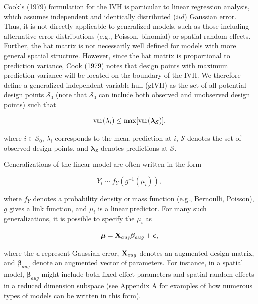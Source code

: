 \documentclass[12pt,english]{article}
\begin{document}
\begin{spacing}{1.9}
Cook's (1979) formulation for the IVH is particular to linear regression analysis, which assumes independent and identically distributed ($iid$) Gaussian error. Thus, it is not directly applicable to generalized models, such as those including alternative error distributions (e.g., Poisson, binomial) or spatial random effects.  Further, the hat matrix is not necessarily well defined for models with more general spatial structure. However, since the hat matrix is proportional to prediction variance, Cook (1979) notes that design points with maximum prediction variance will be located on the boundary of the IVH.  We therefore define a generalized independent variable hull (gIVH) as the set of all potential design points $\mathcal{S}_0$ (note that $\mathcal{S}_0$ can include both observed and unobserved design points) such that
\begin{linenomath*}
\begin{equation}
  \label{eq:gIVH}
  {\rm var}(\lambda_i) \le {\rm max} [{\rm var}(\boldsymbol{\lambda}_{\mathcal{S}})],
\end{equation}
\end{linenomath*}
where $i \in \mathcal{S}_0$, $\lambda_i$ corresponds to the mean prediction at $i$, $\mathcal{S}$ denotes the set of observed design points, and $\boldsymbol{\lambda}_\mathcal{S}$ denotes predictions at $\mathcal{S}$.

Generalizations of the linear model are often written in the form
\begin{linenomath*}
\begin{equation}
  Y_i \sim f_Y(g^{-1}(\mu_i)),
\end{equation}
\end{linenomath*}
where $f_Y$ denotes a probability density or mass function (e.g., Bernoulli, Poisson), $g$ gives a link function, and
$\mu_i$ is a linear predictor.  For many such generalizations, it is possible to specify the $\mu_i$ as
\begin{linenomath*}
\begin{equation}
  \boldsymbol{\mu} = {\bf X}_{aug}\boldsymbol{\beta}_{aug} + \boldsymbol{\epsilon},
  \label{eq:mu-aug}
\end{equation}
\end{linenomath*}
where the $\boldsymbol{\epsilon}$ represent Gaussian error, ${\bf X}_{aug}$ denotes an augmented design matrix, and $\boldsymbol{\beta}_{aug}$ denote an augmented vector of parameters.  For instance, in a spatial model, $\boldsymbol{\beta}_{aug}$ might include both fixed effect parameters and spatial random effects in a reduced dimension subspace (see Appendix A for examples of how numerous types of models can be written in this form).


\end{spacing}
\end{document}
